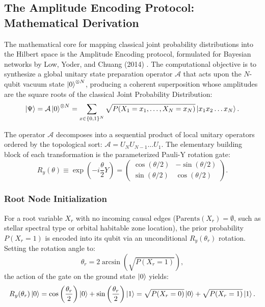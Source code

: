 \subsection{The Amplitude Encoding Protocol: Mathematical Derivation}
The mathematical core for mapping classical joint probability distributions into the Hilbert space is the Amplitude Encoding protocol, formulated for Bayesian networks by Low, Yoder, and Chuang (2014) \cite{low2014}. The computational objective is to synthesize a global unitary state preparation operator $\mathcal{A}$ that acts upon the $N$-qubit vacuum state $\left|0\right\rangle^{\otimes N}$, producing a coherent superposition whose amplitudes are the square roots of the classical Joint Probability Distribution:
\begin{equation}
\left|\Psi\right\rangle = \mathcal{A}\left|0\right\rangle^{\otimes N} = \sum_{x \in \{0,1\}^N} \sqrt{P(X_1=x_1, \dots, X_N=x_N)} \left|x_1 x_2 \dots x_N\right\rangle.
\label{eq:amplitude_encoding_state_ch3}
\end{equation}

The operator $\mathcal{A}$ decomposes into a sequential product of local unitary operators ordered by the topological sort: $\mathcal{A} = U_N U_{N-1} \dots U_1$. The elementary building block of each transformation is the parameterized Pauli-Y rotation gate:
\begin{equation}
R_y(\theta) \equiv \exp\left(-i \frac{\theta}{2} Y\right) = \begin{pmatrix} \cos(\theta/2) & -\sin(\theta/2) \\ \sin(\theta/2) & \cos(\theta/2) \end{pmatrix}.
\label{eq:ry_matrix_ch3}
\end{equation}

\subsubsection{Root Node Initialization}
For a root variable $X_r$ with no incoming causal edges ($\mathrm{Parents}(X_r) = \emptyset$, such as stellar spectral type or orbital habitable zone location), the prior probability $P(X_r = 1)$ is encoded into its qubit via an unconditional $R_y(\theta_r)$ rotation. Setting the rotation angle to:
\begin{equation}
\theta_r = 2 \arcsin\left(\sqrt{P(X_r = 1)}\right),
\label{eq:root_rotation_angle}
\end{equation}
the action of the gate on the ground state $\left|0\right\rangle$ yields:
\begin{equation}
R_y(\theta_r)\left|0\right\rangle = \cos\left(\frac{\theta_r}{2}\right)\left|0\right\rangle + \sin\left(\frac{\theta_r}{2}\right)\left|1\right\rangle = \sqrt{P(X_r=0)}\left|0\right\rangle + \sqrt{P(X_r=1)}\left|1\right\rangle.
\label{eq:root_node_rotation_ch3}
\end{equation}

